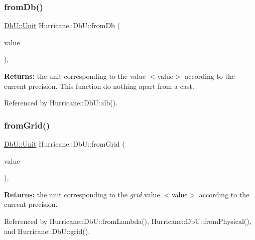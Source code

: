 \subsubsection{\texorpdfstring{from\+Db()}{fromDb()}}
{\footnotesize\ttfamily \hyperlink{group__DbUGroup_ga4fbfa3e8c89347af76c9628ea06c4146}{Db\+U\+::\+Unit} Hurricane\+::\+Db\+U\+::from\+Db (\begin{DoxyParamCaption}\item[{\hyperlink{group__DbUGroup_ga4fbfa3e8c89347af76c9628ea06c4146}{Db\+U\+::\+Unit}}]{value }\end{DoxyParamCaption})\hspace{0.3cm}{\ttfamily [inline]}, {\ttfamily [static]}}

{\bfseries Returns\+:} the unit corresponding to the value {\ttfamily $<$value$>$} according to the current precision. This function do nothing apart from a cast. 

Referenced by Hurricane\+::\+Db\+U\+::db().

\mbox{\label{group__DbUGroup_ga367e1d1b5ac1df076745550cba8a83c1}} 
\subsubsection{\texorpdfstring{from\+Grid()}{fromGrid()}}
{\footnotesize\ttfamily \hyperlink{group__DbUGroup_ga4fbfa3e8c89347af76c9628ea06c4146}{Db\+U\+::\+Unit} Hurricane\+::\+Db\+U\+::from\+Grid (\begin{DoxyParamCaption}\item[{double}]{value }\end{DoxyParamCaption})\hspace{0.3cm}{\ttfamily [inline]}, {\ttfamily [static]}}

{\bfseries Returns\+:} the unit corresponding to the {\itshape grid} value {\ttfamily $<$value$>$} according to the current precision. 

Referenced by Hurricane\+::\+Db\+U\+::from\+Lambda(), Hurricane\+::\+Db\+U\+::from\+Physical(), and Hurricane\+::\+Db\+U\+::grid().

\mbox{\label{group__DbUGroup_ga4b570755b19ea9ff0f2f258a221bd935}} 
